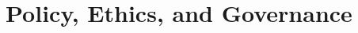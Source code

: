 \documentclass[twoside]{ai_ethics_class}
\begin{document}





\section{Policy, Ethics, and Governance}
\end{document}
